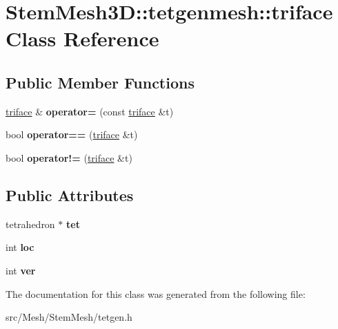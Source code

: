 \hypertarget{classStemMesh3D_1_1tetgenmesh_1_1triface}{}\section{Stem\+Mesh3D\+:\+:tetgenmesh\+:\+:triface Class Reference}
\label{classStemMesh3D_1_1tetgenmesh_1_1triface}
\subsection*{Public Member Functions}
\begin{DoxyCompactItemize}
\item 
\mbox{\label{classStemMesh3D_1_1tetgenmesh_1_1triface_a3e5c8cb1e8dd062865c515e87b474bd8}} 
\hyperlink{classStemMesh3D_1_1tetgenmesh_1_1triface}{triface} \& {\bfseries operator=} (const \hyperlink{classStemMesh3D_1_1tetgenmesh_1_1triface}{triface} \&t)
\item 
\mbox{\label{classStemMesh3D_1_1tetgenmesh_1_1triface_a90bbb7af5b0513cb49f55cddb9e03b19}} 
bool {\bfseries operator==} (\hyperlink{classStemMesh3D_1_1tetgenmesh_1_1triface}{triface} \&t)
\item 
\mbox{\label{classStemMesh3D_1_1tetgenmesh_1_1triface_a6a9aee54fbdf8a223ad3b3b414a805cf}} 
bool {\bfseries operator!=} (\hyperlink{classStemMesh3D_1_1tetgenmesh_1_1triface}{triface} \&t)
\end{DoxyCompactItemize}
\subsection*{Public Attributes}
\begin{DoxyCompactItemize}
\item 
\mbox{\label{classStemMesh3D_1_1tetgenmesh_1_1triface_a55313baeaf881347c90079d5768fe4d3}} 
tetrahedron $\ast$ {\bfseries tet}
\item 
\mbox{\label{classStemMesh3D_1_1tetgenmesh_1_1triface_a5360ca943d03f8d1735d4aeecd5e5593}} 
int {\bfseries loc}
\item 
\mbox{\label{classStemMesh3D_1_1tetgenmesh_1_1triface_a4cc6164b1ac3ff2110d7568ed96528d1}} 
int {\bfseries ver}
\end{DoxyCompactItemize}


The documentation for this class was generated from the following file\+:\begin{DoxyCompactItemize}
\item 
src/\+Mesh/\+Stem\+Mesh/tetgen.\+h\end{DoxyCompactItemize}
